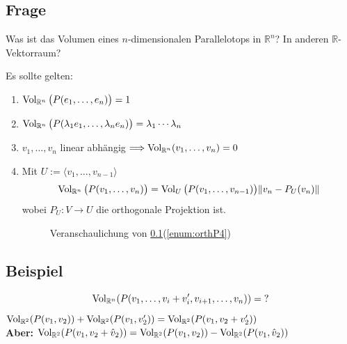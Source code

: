 \subsection[Frage: Was ist das Volumen eines $n$-dimensionalen Prallelotops]{Frage} %
\label{sub:24}
Was ist das Volumen eines $n$-dimensionalen Parallelotops in $\mathds{R}^n$? In anderen $\mathds{R}$-Vektorraum?

Es sollte gelten:
\begin{enumerate}[(1)]
	\item \label{enum:orthP1}$\operatorname{Vol}_{\mathbb{R}^n} \big(P (e_1, \ldots , e_n)\big)= 1$
	\item \label{enum:orthP2} $\operatorname{Vol}_{\mathbb{R}^n} \big(P (\lambda_1 e_1, \ldots , \lambda_n e_n)\big)= \lambda_1  \cdots  \lambda_n$
	\item \label{enum:orthP3}$v_1, \ldots , v_n$ linear abhängig $\Longrightarrow \operatorname{Vol}_{\mathbb{R}^n}(v_1, \ldots , v_n)= 0$
	\item \label{enum:orthP4} Mit $U:= \langle v_1, \ldots , v_{n-1}\rangle$
	\[
		\Vol_{\mathds{R}^n} \big(P (v_1, \dots , v_n)\big) = \Vol_U \big( P(v_1, \ldots , v_{n-1})\big) \norm[]{v_n - P_U (v_n)} 
	\]
	wobei $P_U : V \to U$ die orthogonale Projektion  ist.
	\begin{figure}[h]
		\caption{Veranschaulichung von \ref{sub:24}(\ref{enum:orthP4})}
	\end{figure}
\end{enumerate}

\subsection[Beispiel für Probleme bei der Volumenberechnung]{Beispiel} %
\label{sub:25}
\[
	\Vol_{\mathds{R}^n} \enbrace*{P(v_1, \ldots , v_i + v_i', v_{i+1} , \ldots , v_n)} =  \text{?}
\]
$\Vol_{\mathds{R}^2} \enbrace*{P (v_1, v_2)} + \Vol_{\mathds{R}^2} \enbrace*{P(v_1, v_2')} = \Vol_{\mathds{R}^2} \enbrace*{P(v_1, v_2+v_2')}   $\\
\textbf{Aber:} $\Vol_{\mathds{R}^2} \enbrace*{ P(v_1, v_2 + \hat v_2)} = \Vol_{\mathds{R}^2} \enbrace*{P(v_1, v_2)} - \Vol_{\mathds{R}^2} \enbrace*{P(v_1, \hat v_2)}   $

